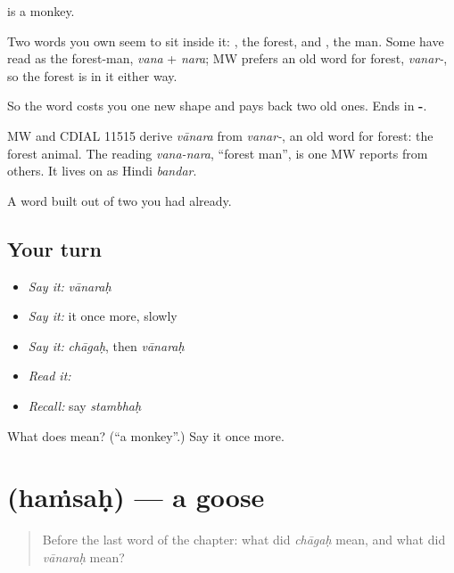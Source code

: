 \textbf{} is a monkey.

Two words you own seem to sit inside it: , the forest, and , the man. Some have read \textbf{} as the forest-man, \emph{vana} + \emph{nara}; MW prefers an old word for forest, \emph{vanar-}, so the forest is in it either way.

So the word costs you one new shape and pays back two old ones. Ends in \textbf{-}.

\begin{cousinweb}
MW and CDIAL 11515 derive \emph{vānara} from \emph{vanar-}, an old word for forest: the forest animal. The reading \emph{vana-nara}, \textquotedblleft{}forest man\textquotedblright{}, is one MW reports from others. It lives on as Hindi \emph{bandar}.
\end{cousinweb}

\begin{grammarlens}[title={What you've built}]
A word built out of two you had already.
\end{grammarlens}

\subsection*{Your turn}
\begin{itemize}
\raggedright
  \item \emph{Say it:} \emph{vānaraḥ}
  \item \emph{Say it:} it once more, slowly
  \item \emph{Say it:} \emph{chāgaḥ}, then \emph{vānaraḥ}
  \item \emph{Read it:} \textbf{}
  \item \emph{Recall:} say \emph{stambhaḥ}
\end{itemize}

\begin{tcolorbox}[breakable,colback=teal!4,colframe=teal!35!black,title={Before you move on}]
What does  mean? (\textquotedblleft{}a monkey\textquotedblright{}.) Say it once more.
\end{tcolorbox}
\section[\texorpdfstring{\sk{हंसः} (haṁsaḥ)}{हंसः (haṁsaḥ)}]{ (haṁsaḥ) — a goose}

\label{lesson:SA-C48-goose}



\begin{quote}
Before the last word of the chapter: what did \emph{chāgaḥ} mean, and what did \emph{vānaraḥ} mean?
\end{quote}

